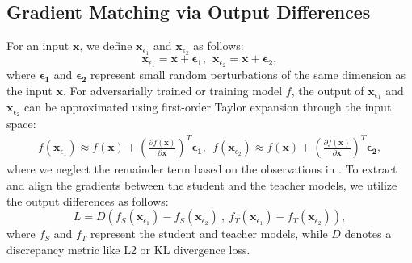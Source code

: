 \documentclass{article} %
\begin{document}


\subsection{Gradient Matching via Output Differences}
For an input $\textbf{x}$, we define $\textbf{x}_{\epsilon_1} $ and $\textbf{x}_{\epsilon_2}$ as follows:
\begin{equation}\label{method-1}
    \textbf{x}_{\epsilon_1} = \textbf{x} + \boldsymbol{\epsilon_1}, \ \ \textbf{x}_{\epsilon_2} = \textbf{x} + \boldsymbol{\epsilon_2},
\end{equation}
where $\boldsymbol{\epsilon_1}$ and $\boldsymbol{\epsilon_2}$ represent small random perturbations of the same dimension as the input $\textbf{x}$.
For adversarially trained or training model $f$, the output of $\textbf{x}_{\epsilon_1}$ and $\textbf{x}_{\epsilon_2}$ can be approximated using first-order Taylor expansion through the input space:
\begin{equation}\label{method-2}
\begin{split}
    f(\textbf{x}_{\epsilon_1}) \approx f(\textbf{x}) + 
    \left ( \frac{\partial f(\textbf{x})}{\partial \textbf{x}}\right )^T \boldsymbol{\epsilon_1}, \ \ 
    f(\textbf{x}_{\epsilon_2}) \approx f(\textbf{x}) + 
    \left ( \frac{\partial f(\textbf{x})}{\partial \textbf{x}}\right )^T \boldsymbol{\epsilon_2}, 
\end{split}
\end{equation}
where we neglect the remainder term based on the observations in .
To extract and align the gradients between the student and the teacher models, we utilize the output differences as follows:
\begin{equation}\label{method-3}
    L = D\left (f_S(\textbf{x}_{\epsilon_1}) - f_S(\textbf{x}_{\epsilon_2}) \ ,\  f_T(\textbf{x}_{\epsilon_1}) - f_T(\textbf{x}_{\epsilon_2}) \right ),
\end{equation}
where $f_S$ and $f_T$ represent the student and teacher models, while $D$ denotes a discrepancy metric like L2 or KL divergence loss.
\end{document}
